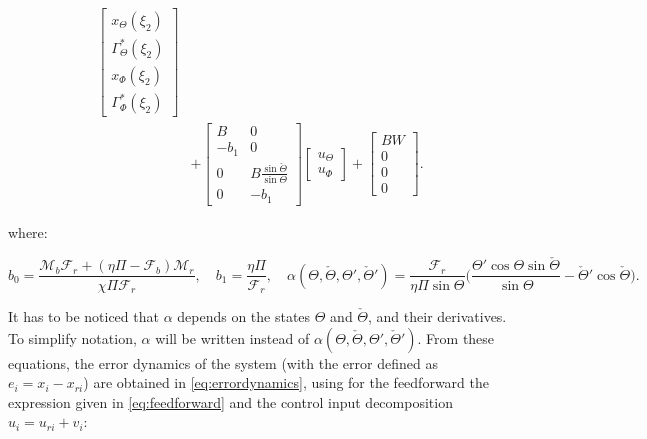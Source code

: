 \documentclass[main.tex]{subfiles}
\begin{document}
\begin{align}
	\begin{bmatrix}
	x_\Theta(\xi_2) \\
	\Gamma_\Theta^{*}(\xi_2) \\
	x_\Phi(\xi_2) \\
	\Gamma_\Phi^{*} (\xi_2)
	\end{bmatrix}\nonumber \\ 
	&+
	\begin{bmatrix}
	B & 0 \\
	-b_1 & 0 \\
	0 & B \frac{\sin \check{\Theta}}{\sin \Theta} \\
	0 & -b_1
	\end{bmatrix}
	\begin{bmatrix}
	u_\Theta \\
	u_\Phi
	\end{bmatrix} +
	\begin{bmatrix}
	BW \\
	0 \\
	0 \\
	0
	\end{bmatrix}.
	\end{align}
	
	where:
	
	\begin{equation}
		b_0 = \frac{\mathcal{M}_b \mathcal{F}_r + (\eta \Pi - \mathcal{F}_b)\mathcal{M}_r}{\chi \Pi \mathcal{F}_r}, \quad b_1 = \frac{\eta \Pi}{\mathcal{F}_r}, \quad \alpha (\Theta,\check{\Theta},\Theta',\check{\Theta}') = \frac{\mathcal{F}_r}{\eta \Pi \sin \Theta} \bigg( \frac{\Theta' \cos \Theta \sin \check{\Theta}}{\sin \Theta}  - \check{\Theta}' \cos \check{\Theta}\bigg). \label{eq:Constants}
	\end{equation}
	
	It has to be noticed that $\alpha$ depends on the states $\Theta$ and $\check{\Theta}$, and their derivatives. To simplify notation, $\alpha$ will be written  instead of $\alpha(\Theta,\check{\Theta}, \Theta', \check{\Theta}')$. From these equations, the error dynamics of the system (with the error defined as $e_i = x_i - x_{ri}$) are obtained in \eqref{eq:errordynamics}, using for the feedforward the expression given in \eqref{eq:feedforward} and the control input decomposition $u_i = u_{ri} + v_i$:
		
\end{document}
